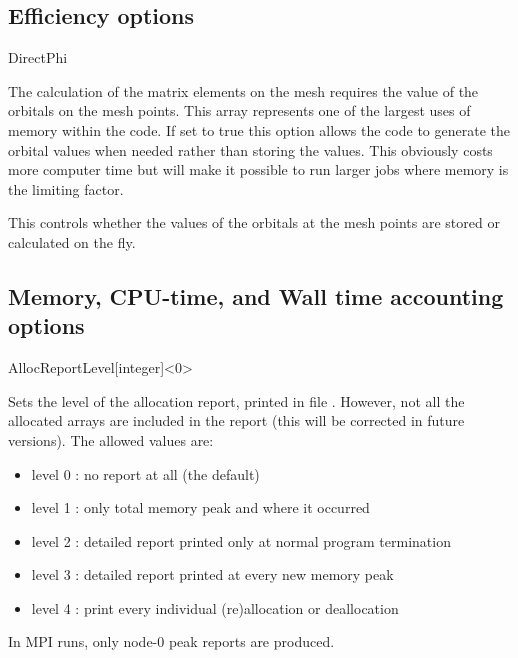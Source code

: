 \subsection{Efficiency options}

\begin{fdflogicalF}{DirectPhi}

  The calculation of the matrix elements on the mesh requires the
  value of the orbitals on the mesh points. This array represents one
  of the largest uses of memory within the code. If set to true this
  option allows the code to generate the orbital values when needed
  rather than storing the values. This obviously costs more computer
  time but will make it possible to run larger jobs where memory is
  the limiting factor.

  This controls whether the values of the orbitals at the mesh points
  are stored or calculated on the fly.
  
\end{fdflogicalF}


\subsection{Memory, CPU-time, and Wall time accounting options}

\begin{fdfentry}{AllocReportLevel}[integer]<$0$>

  Sets the level of the allocation report, printed in file
  . However, not all the allocated arrays are included
  in the report (this will be corrected in future versions). The
  allowed values are:
  \begin{itemize}
    \item%
    level 0 : no report at all (the default)
    \item%
    level 1 : only total memory peak and where it occurred
    \item%
    level 2 : detailed report printed only at
    normal program termination
    \item%
    level 3 : detailed report printed at every new memory peak
    \item%
    level 4 : print every individual (re)allocation or deallocation
  \end{itemize}

  \note In MPI runs, only node-0 peak reports are produced.
  
\end{fdfentry}


